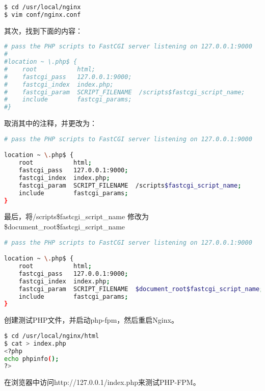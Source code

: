 \begin{lstlisting}[language=bash]
$ cd /usr/local/nginx
$ vim conf/nginx.conf
\end{lstlisting}

其次，找到下面的内容：


\begin{lstlisting}[language=bash]
# pass the PHP scripts to FastCGI server listening on 127.0.0.1:9000
#
#location ~ \.php$ {
#    root           html;
#    fastcgi_pass   127.0.0.1:9000;
#    fastcgi_index  index.php;
#    fastcgi_param  SCRIPT_FILENAME  /scripts$fastcgi_script_name;
#    include        fastcgi_params;
#}
\end{lstlisting}


取消其中的注释，并更改为：

\begin{lstlisting}[language=bash]
# pass the PHP scripts to FastCGI server listening on 127.0.0.1:9000

location ~ \.php$ {
    root           html;
    fastcgi_pass   127.0.0.1:9000;
    fastcgi_index  index.php;
    fastcgi_param  SCRIPT_FILENAME  /scripts$fastcgi_script_name;
    include        fastcgi_params;
}
\end{lstlisting}

最后，将/scripts\$fastcgi\_script\_name 修改为 \$document\_root\$fastcgi\_script\_name

\begin{lstlisting}[language=bash]
# pass the PHP scripts to FastCGI server listening on 127.0.0.1:9000

location ~ \.php$ {
    root           html;
    fastcgi_pass   127.0.0.1:9000;
    fastcgi_index  index.php;
    fastcgi_param  SCRIPT_FILENAME  $document_root$fastcgi_script_name;
    include        fastcgi_params;
}
\end{lstlisting}

创建测试PHP文件，并启动php-fpm，然后重启Nginx。


\begin{lstlisting}[language=bash]
$ cd /usr/local/nginx/html
$ cat > index.php
<?php
echo phpinfo();
?>

\end{lstlisting}

在浏览器中访问http://127.0.0.1/index.php来测试PHP-FPM。



\begin{lstlisting}[language=bash]

\end{lstlisting}


